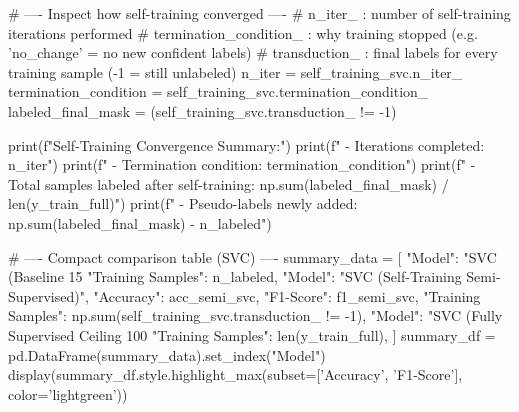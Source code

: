 \begin{codebox}[title={Inspect how self-training converged}]
# ---- Inspect how self-training converged ----
# n_iter_                 : number of self-training iterations performed
# termination_condition_  : why training stopped (e.g. 'no_change' = no new confident labels)
# transduction_           : final labels for every training sample (-1 = still unlabeled)
n_iter = self_training_svc.n_iter_
termination_condition = self_training_svc.termination_condition_
labeled_final_mask = (self_training_svc.transduction_ != -1)

print(f"Self-Training Convergence Summary:")
print(f" - Iterations completed: {n_iter}")
print(f" - Termination condition: {termination_condition}")
print(f" - Total samples labeled after self-training: {np.sum(labeled_final_mask)} / {len(y_train_full)}")
print(f" - Pseudo-labels newly added: {np.sum(labeled_final_mask) - n_labeled}")
\end{codebox}

\begin{codebox}[title={Compact comparison table (SVC)}]
# ---- Compact comparison table (SVC) ----
summary_data = [
    {"Model": "SVC (Baseline 15%
     "Training Samples": n_labeled},
    {"Model": "SVC (Self-Training Semi-Supervised)", "Accuracy": acc_semi_svc, "F1-Score": f1_semi_svc,
     "Training Samples": np.sum(self_training_svc.transduction_ != -1)},
    {"Model": "SVC (Fully Supervised Ceiling 100%
     "Training Samples": len(y_train_full)},
]
summary_df = pd.DataFrame(summary_data).set_index("Model")
display(summary_df.style.highlight_max(subset=['Accuracy', 'F1-Score'], color='lightgreen'))
\end{codebox}
